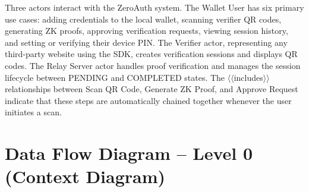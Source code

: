 \begin{minipage}{\linewidth}
\label{fig:usecase}
\end{minipage}

\vspace{0.4cm}
Three actors interact with the ZeroAuth system. The Wallet User has six primary use cases: adding credentials to the local wallet, scanning verifier QR codes, generating ZK proofs, approving verification requests, viewing session history, and setting or verifying their device PIN. The Verifier actor, representing any third-party website using the SDK, creates verification sessions and displays QR codes. The Relay Server actor handles proof verification and manages the session lifecycle between PENDING and COMPLETED states. The $\langle\langle$includes$\rangle\rangle$ relationships between Scan QR Code, Generate ZK Proof, and Approve Request indicate that these steps are automatically chained together whenever the user initiates a scan.

\newpage
\section{Data Flow Diagram -- Level 0 (Context Diagram)}

